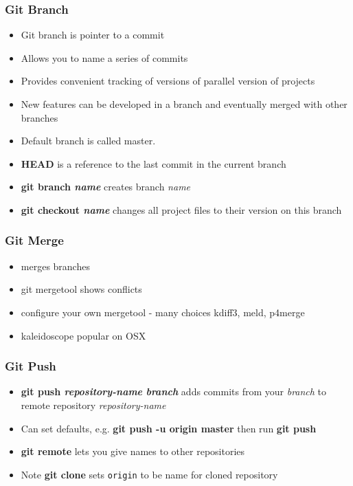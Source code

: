 \begin{frame}
\frametitle{Git Branch}

\begin{itemize}
\item Git branch is pointer to a commit

\item Allows you to name a series of commits

\item Provides convenient tracking of versions of parallel version of projects

\item New features can be developed in a branch and eventually merged with other branches

\item Default branch is called master. 

\item {\bf HEAD} is a reference to the last commit in the current branch

\item  {\bf git branch {\it name}} creates branch {\it name}

\item  {\bf git checkout {\it name}} changes all project files to their version on this branch
\end{itemize}
\end{frame}

\begin{frame}
\frametitle{Git Merge}

\begin{itemize}
\item merges branches
\item git mergetool shows conflicts
\item configure your own mergetool - many choices kdiff3, meld, p4merge
\item kaleidoscope popular on OSX 
\end{itemize}

\end{frame}

\begin{frame}
\frametitle{Git Push}

\begin{itemize}
\item {\bf git push {\it repository-name} {\it branch}} adds commits from your {\it branch} to remote repository {\it repository-name} 

\item Can set defaults, e.g. {\bf git push -u origin master} then run {\bf git push}

\item {\bf git remote} lets you give names to other repositories

\item Note {\bf git clone} sets {\tt origin} to be name for cloned repository
\end{itemize}
\end{frame}

